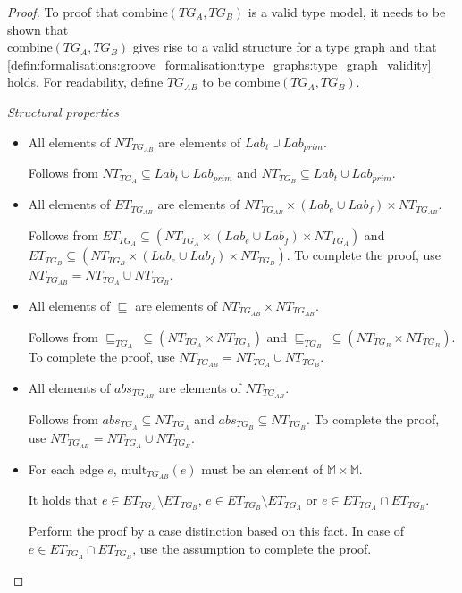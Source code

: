 \begin{proof}
To proof that $\mathrm{combine}(TG_A, TG_B)$ is a valid type model, it needs to be shown that\\ $\mathrm{combine}(TG_A, TG_B)$ gives rise to a valid structure for a type graph and that \cref{defin:formalisations:groove_formalisation:type_graphs:type_graph_validity} holds. For readability, define $TG_{AB}$ to be $\mathrm{combine}(TG_A, TG_B)$.

\emph{Structural properties}
\begin{itemize}
\item All elements of $NT_{TG_{AB}}$ are elements of $Lab_t \cup Lab_{prim}$.

Follows from $NT_{TG_{A}} \subseteq Lab_t \cup Lab_{prim}$ and $NT_{TG_{B}} \subseteq Lab_t \cup Lab_{prim}$.


\item All elements of $ET_{TG_{AB}}$ are elements of $NT_{TG_{AB}} \times (Lab_e \cup Lab_f) \times NT_{TG_{AB}}$.

Follows from $ET_{TG_{A}} \subseteq (NT_{TG_{A}} \times (Lab_e \cup Lab_f) \times NT_{TG_{A}})$ and $ET_{TG_{B}} \subseteq (NT_{TG_{B}} \times (Lab_e \cup Lab_f) \times NT_{TG_{B}})$. To complete the proof, use $NT_{TG_{AB}} = NT_{TG_{A}} \cup NT_{TG_{B}}$.


\item All elements of $\sqsubseteq$ are elements of $NT_{TG_{AB}} \times NT_{TG_{AB}}$.

Follows from $\sqsubseteq_{TG_{A}}\ \subseteq (NT_{TG_{A}} \times NT_{TG_{A}})$ and $\sqsubseteq_{TG_{B}}\ \subseteq (NT_{TG_{B}} \times NT_{TG_{B}})$. To complete the proof, use $NT_{TG_{AB}} = NT_{TG_{A}} \cup NT_{TG_{B}}$.


\item All elements of $abs_{TG_{AB}}$ are elements of $NT_{TG_{AB}}$.

Follows from $abs_{TG_{A}} \subseteq NT_{TG_{A}}$ and $abs_{TG_{B}} \subseteq NT_{TG_{B}}$. To complete the proof, use $NT_{TG_{AB}} = NT_{TG_{A}} \cup NT_{TG_{B}}$.


\item For each edge $e$, $\mathrm{mult}_{TG_{AB}}(e)$ must be an element of $\mathbb{M} \times \mathbb{M}$.

It holds that $e \in ET_{TG_{A}} \setminus ET_{TG_{B}}$, $e \in ET_{TG_{B}} \setminus ET_{TG_{A}}$ or $e \in ET_{TG_{A}} \cap ET_{TG_{B}}$.

Perform the proof by a case distinction based on this fact. In case of $e \in ET_{TG_{A}} \cap ET_{TG_{B}}$, use the assumption to complete the proof.



\end{itemize}
\end{proof}
